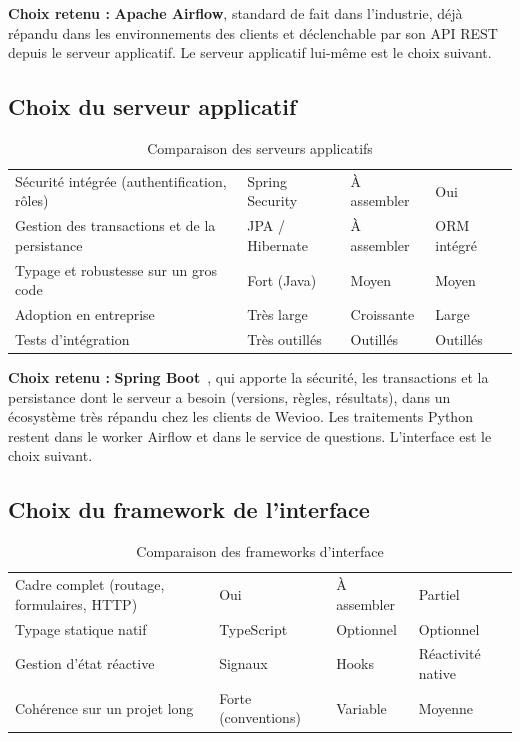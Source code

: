 \noindent\textbf{Choix retenu :} \textbf{Apache Airflow}, standard de fait dans l'industrie, déjà répandu dans les environnements des clients et déclenchable par son API REST depuis le serveur applicatif. Le serveur applicatif lui-même est le choix suivant.

\subsection{Choix du serveur applicatif}

\begin{table}[H]
\centering
\small
\begin{tabular}{|L{3.8cm}|L{3.3cm}|L{3.3cm}|L{3.4cm}|}
\hline
{} &  &  &  \\ \hline
Sécurité intégrée (authentification, rôles) & Spring Security & À assembler & Oui \\ \hline
Gestion des transactions et de la persistance & JPA / Hibernate & À assembler & ORM intégré \\ \hline
Typage et robustesse sur un gros code & Fort (Java) & Moyen & Moyen \\ \hline
Adoption en entreprise & Très large & Croissante & Large \\ \hline
Tests d'intégration & Très outillés & Outillés & Outillés \\ \hline
\end{tabular}
\caption{Comparaison des serveurs applicatifs}
\label{tab:cmp-backend}
\end{table}

\noindent\textbf{Choix retenu :} \textbf{Spring Boot}~\cite{spring}, qui apporte la sécurité, les transactions et la persistance dont le serveur a besoin (versions, règles, résultats), dans un écosystème très répandu chez les clients de Wevioo. Les traitements Python restent dans le worker Airflow et dans le service de questions. L'interface est le choix suivant.

\subsection{Choix du framework de l'interface}

\begin{table}[H]
\centering
\small
\begin{tabular}{|L{3.8cm}|L{3.3cm}|L{3.3cm}|L{3.4cm}|}
\hline
{} &  &  &  \\ \hline
Cadre complet (routage, formulaires, HTTP) & Oui & À assembler & Partiel \\ \hline
Typage statique natif & TypeScript & Optionnel & Optionnel \\ \hline
Gestion d'état réactive & Signaux & Hooks & Réactivité native \\ \hline
Cohérence sur un projet long & Forte (conventions) & Variable & Moyenne \\ \hline
\end{tabular}
\caption{Comparaison des frameworks d'interface}
\label{tab:cmp-front}
\end{table}

